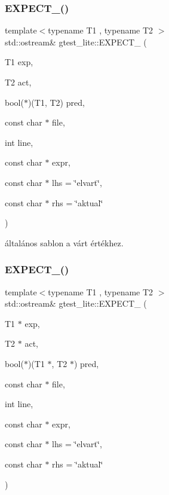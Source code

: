 \subsubsection{\texorpdfstring{EXPECT\_()}{EXPECT\_()}\hspace{0.1cm}{\footnotesize\ttfamily [1/2]}}
{\footnotesize\ttfamily template$<$typename T1 , typename T2 $>$ \\
std\+::ostream\& gtest\+\_\+lite\+::\+E\+X\+P\+E\+C\+T\+\_\+ (\begin{DoxyParamCaption}\item[{T1}]{exp,  }\item[{T2}]{act,  }\item[{bool($\ast$)(T1, T2)}]{pred,  }\item[{const char $\ast$}]{file,  }\item[{int}]{line,  }\item[{const char $\ast$}]{expr,  }\item[{const char $\ast$}]{lhs = {\ttfamily \char`\"{}elvart\char`\"{}},  }\item[{const char $\ast$}]{rhs = {\ttfamily \char`\"{}aktual\char`\"{}} }\end{DoxyParamCaption})}



általános sablon a várt értékhez. 

\mbox{\label{namespacegtest__lite_a835d542f226b31cf5cd28033303aa7d7}} 
\subsubsection{\texorpdfstring{EXPECT\_()}{EXPECT\_()}\hspace{0.1cm}{\footnotesize\ttfamily [2/2]}}
{\footnotesize\ttfamily template$<$typename T1 , typename T2 $>$ \\
std\+::ostream\& gtest\+\_\+lite\+::\+E\+X\+P\+E\+C\+T\+\_\+ (\begin{DoxyParamCaption}\item[{T1 $\ast$}]{exp,  }\item[{T2 $\ast$}]{act,  }\item[{bool($\ast$)(T1 $\ast$, T2 $\ast$)}]{pred,  }\item[{const char $\ast$}]{file,  }\item[{int}]{line,  }\item[{const char $\ast$}]{expr,  }\item[{const char $\ast$}]{lhs = {\ttfamily \char`\"{}elvart\char`\"{}},  }\item[{const char $\ast$}]{rhs = {\ttfamily \char`\"{}aktual\char`\"{}} }\end{DoxyParamCaption})}



